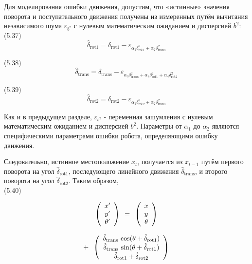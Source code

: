 \documentclass[10pt,a4paper]{article}
\begin{document}
Для моделирования ошибки движения, допустим, что «истинные» значения поворота и поступательного движения получены из измеренных путём вычитания независимого шума $\varepsilon_{b^2}$ с нулевым математическим ожиданием и дисперсией $b^2$:\\

(5.37)
$$\hat{\delta}_{\text{rot}1}=\delta_{\text{rot}1}-\varepsilon_{\alpha_1\delta_{\text{rot}1}^2+\alpha_2\delta_{\text{trans}}^2}$$

(5.38)
$$\hat{\delta}_{\text{trans}}=\delta_{\text{trans}}-\varepsilon_{\alpha_3\delta_{\text{trans}}^2+\alpha_4\delta_{\text{rot}1}^2+\alpha_4\delta_{\text{rot}2}^2}$$

(5.39)
$$\hat{\delta}_{\text{rot}2}=\delta_{\text{rot}2}-\varepsilon_{\alpha_1\delta_{\text{rot}2}^2+\alpha_2\delta_{\text{trans}}^2}$$

Как и в предыдущем разделе, $\varepsilon_{b^2}$ - переменная зашумления с нулевым математическим ожиданием и дисперсией $b^2$.
Параметры от $\alpha_1$ до $\alpha_2$ являются специфическими параметрами ошибки робота, определяющими ошибку движения.

Следовательно, истинное местоположение $x_t$, получается из $x_{t-1}$ путём первого поворота на угол $\hat{\delta}_{\text{rot}1}$, последующего линейного движения $\hat{\delta}_{\text{trans}}$, и второго поворота на угол $\hat{\delta}_{\text{rot}2}$. Таким образом,\\

(5.40)
\begin{minipage}{0.3\textwidth}
	\begin{equation*}
	\left(\begin{array}{c}
	x'\\
	y'\\
	\theta'\\
	\end{array}\right)
	\hspace{2mm}
	\mbox {=} \hspace{2mm}\left(\begin{array}{c}
	x\\
	y\\
	\theta\\
	\end{array}\right)
	\end{equation*}
\end{minipage}
\begin{minipage}{0.3\textwidth}
	\begin{equation*}
	\mbox {+} \hspace{2mm} 
	\left(\begin{array}{c}
	\hat{\delta}_{\text{trans}}\,\cos(\theta+\hat{\delta}_{\text{rot}1})\\
	\hat{\delta}_{\text{trans}}\,\sin(\theta+\hat{\delta}_{\text{rot}1})\\
	\hat{\delta}_{\text{rot}1}+\hat{\delta}_{\text{rot}2}\\
	\end{array}\right)
	\end{equation*}
\end{minipage}\\
\end{document}
